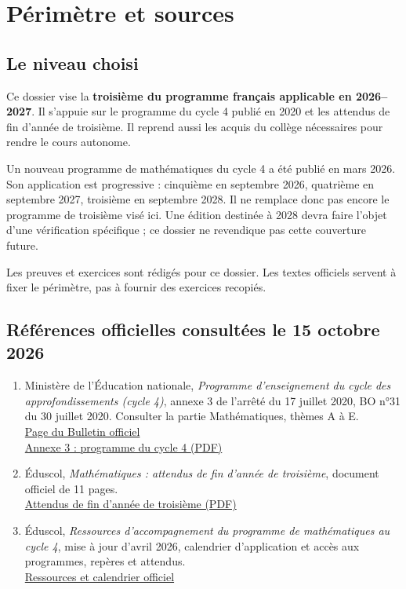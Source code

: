 \documentclass[11pt,a4paper,oneside]{book}
\begin{document}
\frontmatter\tableofcontents\mainmatter
\chapter{Périmètre et sources}
\section{Le niveau choisi}
Ce dossier vise la \textbf{troisième du programme français applicable en 2026--2027}. Il s'appuie sur le programme du cycle 4 publié en 2020 et les attendus de fin d'année de troisième. Il reprend aussi les acquis du collège nécessaires pour rendre le cours autonome.

Un nouveau programme de mathématiques du cycle 4 a été publié en mars 2026. Son application est progressive : cinquième en septembre 2026, quatrième en septembre 2027, troisième en septembre 2028. Il ne remplace donc pas encore le programme de troisième visé ici. Une édition destinée à 2028 devra faire l'objet d'une vérification spécifique ; ce dossier ne revendique pas cette couverture future.

Les preuves et exercices sont rédigés pour ce dossier. Les textes officiels servent à fixer le périmètre, pas à fournir des exercices recopiés.
\section{Références officielles consultées le 15 octobre 2026}
\begin{enumerate}[label={S\arabic*.}]
\item Ministère de l'Éducation nationale, \emph{Programme d'enseignement du cycle des approfondissements (cycle 4)}, annexe 3 de l'arrêté du 17 juillet 2020, BO n°31 du 30 juillet 2020. Consulter la partie Mathématiques, thèmes A à E.\\
\href{https://www.education.gouv.fr/bo/20/Hebdo31/MENE2018714A.htm}{Page du Bulletin officiel}\\
\href{https://cache.media.education.gouv.fr/file/31/89/1/ensel714_annexe3_1312891.pdf}{Annexe 3 : programme du cycle 4 (PDF)}
\item Éduscol, \emph{Mathématiques : attendus de fin d'année de troisième}, document officiel de 11 pages.\\
\href{https://eduscol.education.gouv.fr/sites/default/files/document/18-maths-3e-attendus-eduscol1114748pdf-74688.pdf}{Attendus de fin d'année de troisième (PDF)}
\item Éduscol, \emph{Ressources d'accompagnement du programme de mathématiques au cycle 4}, mise à jour d'avril 2026, calendrier d'application et accès aux programmes, repères et attendus.\\
\href{https://eduscol.education.gouv.fr/5736/ressources-d-accompagnement-du-programme-de-mathematiques-au-cycle-4}{Ressources et calendrier officiel}
\end{enumerate}
\end{document}
